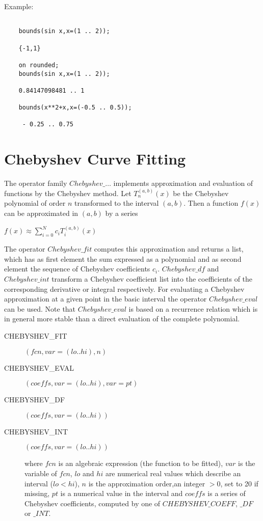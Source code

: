 Example:

\begin{verbatim}

    bounds(sin x,x=(1 .. 2));

    {-1,1}

    on rounded;
    bounds(sin x,x=(1 .. 2));

    0.84147098481 .. 1

    bounds(x**2+x,x=(-0.5 .. 0.5));

     - 0.25 .. 0.75

\end{verbatim}

\section{Chebyshev Curve Fitting}

The operator family $Chebyshev\_\ldots$ implements approximation
and evaluation of functions by the Chebyshev method.
Let $T_n^{(a,b)}(x)$ be the Chebyshev polynomial of order $n$
transformed to the interval $(a,b)$. Then a function $f(x)$ can be
approximated in $(a,b)$ by a series

$f(x) \approx \sum_{i=0}^N c_i T_i^{(a,b)}(x)$

The operator $Chebyshev\_fit$ computes this approximation and
returns a list, which has as first element the sum expressed
as a polynomial and as second element the sequence
of Chebyshev coefficients ${c_i}$.
$Chebyshev\_df$ and $Chebyshev\_int$ transform a Chebyshev
coefficient list into the coefficients of the corresponding
derivative or integral respectively. For evaluating a Chebyshev
approximation at a given point in the basic interval the
operator $Chebyshev\_eval$ can be used. Note that
$Chebyshev\_eval$ is based on a recurrence relation which is
in general more stable than a direct evaluation of the
complete polynomial.

\begin{description}
\item[CHEBYSHEV\_FIT] $(fcn,var=(lo .. hi),n)$

\item[CHEBYSHEV\_EVAL] $(coeffs,var=(lo .. hi),var=pt)$

\item[CHEBYSHEV\_DF] $(coeffs,var=(lo .. hi))$

\item[CHEBYSHEV\_INT] $(coeffs,var=(lo .. hi))$

where $fcn$ is an algebraic expression (the function to be
fitted), $var$ is the variable of $fcn$, $lo$ and $hi$ are
numerical real values which describe an interval ($lo < hi$),
$n$ is the approximation order,an integer $>0$, set to 20 if missing,
$pt$ is a numerical value in the interval and $coeffs$ is
a series of Chebyshev coefficients, computed by one of
$CHEBYSHEV\_COEFF$, $\_DF$ or $\_INT$.
\end{description}

